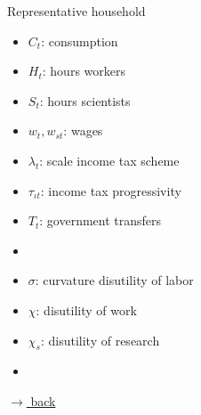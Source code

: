 \documentclass[11pt,aspectratio=169]{beamer}
\begin{document}
\begin{frame}{Representative household}
		\small
		\vspace{4mm}
		\hspace{-8mm}
		\begin{minipage}[t!]{0.26\textwidth}
			\vspace{7mm}
			\begin{itemize}
				\item[] $C_{t}$: consumption\vspace{-2mm}
				\item[] $H_{t}$: hours workers\vspace{-2mm}
				\item[] $S_{t}$: hours scientists\vspace{-2mm}
				\item[] $w_{t}, w_{st}$: wages  %
			\end{itemize}
		\end{minipage}
		\begin{minipage}[t!]{0.37\textwidth}
			\vspace{8mm}
			\begin{itemize}
				\item[] $\lambda_{t}$: scale income tax scheme  \vspace{-2mm}
				\item[] $\tau_{\iota t}$: income tax progressivity
				\vspace{-2mm}	
				\item[] $T_{t}$: government transfers
				\vspace{-2mm}	
				\item[]%
			\end{itemize}
		\end{minipage}
		\begin{minipage}[t!]{0.39\textwidth}
			\vspace{8mm}
			\begin{itemize}
				\item[] $\sigma$: curvature disutility of labor  \vspace{-2mm}
				\item[] $\chi$: disutility of work
				\vspace{-2mm}	
				\item[] $\chi_s$: disutility of research
				\vspace{-2mm}	
				\item[]%
			\end{itemize}
		\end{minipage}
	
		\vspace{-2mm}
		\hfill \hyperlink{backScheme}{\tiny{$\rightarrow$ back}}
	\end{frame}
\end{document}
